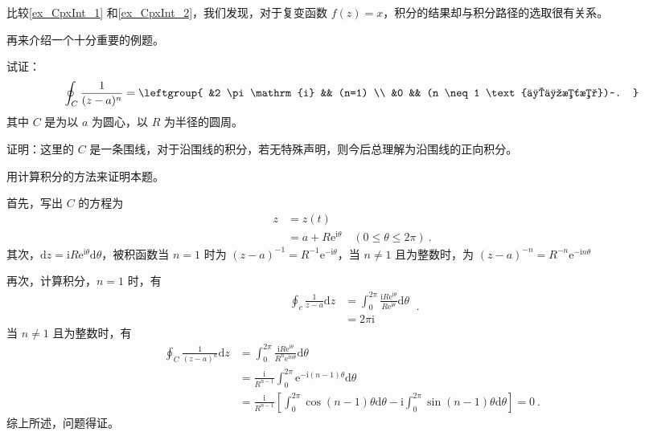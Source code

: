 比较\autoref{ex_CpxInt_1} 和\autoref{ex_CpxInt_2}，我们发现，对于复变函数 $f(z)=x$，积分的结果却与积分路径的选取很有关系。

再来介绍一个十分重要的例题。

\begin{example}{}
试证：
\begin{equation}
\oint_{C} \frac{1}{(z-a)^{n}}=
\leftgroup{
&2 \pi \mathrm{i} && (n=1) \\
&0 && (n \neq 1 \text{且为整数})~.
}\end{equation}
其中 $C$ 是为以 $a $ 为圆心，以 $R $ 为半径的圆周。

证明：这里的 $C $ 是一条围线，对于沿围线的积分，若无特殊声明，则今后总理解为沿围线的正向积分。

用计算积分的方法来证明本题。

首先，写出 $C $ 的方程为
\begin{equation}
\begin{aligned} z &=z(t) \\ &=a+R \mathrm{e}^{\mathrm{i} \theta} \quad(0 \leqslant \theta \leqslant 2 \pi) ~.\end{aligned}
\end{equation}
其次，$\mathrm{d} z=\mathrm{i} R \mathrm{e}^{\mathrm{i} \theta} \mathrm{d} \theta$，被积函数当 $n =1$ 时为 $(z-a)^{-1}=R^{-1} \mathrm{e}^{-\mathrm{i} \theta}$，当 $n \ne 1$ 且为整数时，为 $(z-a)^{-n}=R^{-n} \mathrm{e}^{-\mathrm{i} n \theta}$

再次，计算积分，$n=1$ 时，有
\begin{equation}
\begin{aligned} \oint_{c} \frac{1}{z-a} \mathrm{d} z &=\int_{0}^{2 \pi} \frac{\mathrm{i} R \mathrm{e}^{\mathrm{i} \theta}}{R \mathrm{e}^{\mathrm{i} \theta}} \mathrm{d} \theta \\ &=2 \pi \mathrm{i} \end{aligned}~.
\end{equation}
当 $n \neq 1$ 且为整数时，有
\begin{equation}
\begin{aligned} \oint_{C} \frac{1}{(z-a)^{n}} \mathrm{d} z &=\int_{0}^{2 \pi} \frac{\mathrm{i} R \mathrm{e}^{\mathrm{i} \theta}}{R^{n} \mathrm{e}^{\mathrm{i} n \theta}} \mathrm{d} \theta \\ &=\frac{\mathrm{i}}{R^{n-1}} \int_{0}^{2 \pi} \mathrm{e}^{-\mathrm{i}(n-1) \theta} \mathrm{d} \theta \\ &=\frac{\mathrm{i}}{R^{n-1}}\left[\int_{0}^{2 \pi} \cos (n-1) \theta \mathrm{d} \theta-\mathrm{i} \int_{0}^{2 \pi} \sin (n-1) \theta \mathrm{d} \theta\right]=0~. \end{aligned}
\end{equation}
综上所述，问题得证。
\end{example}

